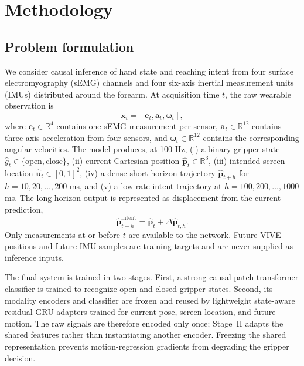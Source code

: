 
\section{Methodology}
\label{sec:methodology}

\subsection{Problem formulation}

We consider causal inference of hand state and reaching intent from four
surface electromyography (sEMG) channels and four six-axis inertial measurement
units (IMUs) distributed around the forearm.  At acquisition time $t$, the raw
wearable observation is
\begin{equation}
    \mathbf{x}_t = \left[\mathbf{e}_t,\mathbf{a}_t,\boldsymbol{\omega}_t\right],
\end{equation}
where $\mathbf{e}_t\in\mathbb{R}^{4}$ contains one sEMG measurement per sensor,
$\mathbf{a}_t\in\mathbb{R}^{12}$ contains three-axis acceleration from four
sensors, and $\boldsymbol{\omega}_t\in\mathbb{R}^{12}$ contains the corresponding
angular velocities.  The model produces, at 100 Hz, (i) a binary gripper state
$\hat{g}_t\in\{\text{open},\text{close}\}$, (ii) current Cartesian position
$\hat{\mathbf{p}}_t\in\mathbb{R}^{3}$, (iii) intended screen location
$\hat{\mathbf{u}}_t\in[0,1]^2$, (iv) a dense short-horizon trajectory
$\hat{\mathbf{p}}_{t+h}$ for $h=10,20,\ldots,200$ ms, and (v) a low-rate intent
trajectory at $h=100,200,\ldots,1000$ ms.  The long-horizon output is represented
as displacement from the current prediction,
\begin{equation}
    \hat{\mathbf{p}}^{\mathrm{intent}}_{t+h}
    = \hat{\mathbf{p}}_t + \Delta\hat{\mathbf{p}}_{t,h}.
\end{equation}
Only measurements at or before $t$ are available to the network.  Future VIVE
positions and future IMU samples are training targets and are never supplied as
inference inputs.

The final system is trained in two stages.  First, a strong causal
patch-transformer classifier is trained to recognize open and closed gripper
states.  Second, its modality encoders and classifier are frozen and reused by
lightweight state-aware residual-GRU adapters trained for current pose, screen
location, and future motion.  The raw signals are therefore encoded only once;
Stage~II adapts the shared features rather than instantiating another encoder.
Freezing the shared representation prevents motion-regression gradients from
degrading the gripper decision.

